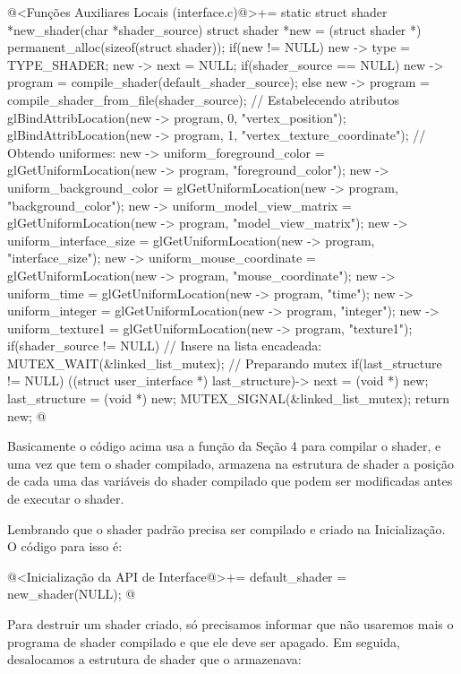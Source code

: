 \iniciocodigo
@<Funções Auxiliares Locais (interface.c)@>+=
static struct shader *new_shader(char *shader_source){
  struct shader *new = (struct shader *) permanent_alloc(sizeof(struct shader));
  if(new != NULL){
    new -> type = TYPE_SHADER;
    new -> next = NULL;
    if(shader_source == NULL)
      new -> program = compile_shader(default_shader_source);
    else
      new -> program = compile_shader_from_file(shader_source);
    // Estabelecendo atributos
    glBindAttribLocation(new -> program, 0, "vertex_position");
    glBindAttribLocation(new -> program, 1, "vertex_texture_coordinate");
    // Obtendo uniformes:
    new -> uniform_foreground_color =  glGetUniformLocation(new -> program,
                                                            "foreground_color");
    new -> uniform_background_color =  glGetUniformLocation(new -> program,
                                                            "background_color");
    new -> uniform_model_view_matrix = glGetUniformLocation(new -> program,
                                                            "model_view_matrix");
    new -> uniform_interface_size = glGetUniformLocation(new -> program,
                                                         "interface_size");
    new -> uniform_mouse_coordinate = glGetUniformLocation(new -> program,
                                                         "mouse_coordinate");
    new -> uniform_time = glGetUniformLocation(new -> program, "time");
    new -> uniform_integer = glGetUniformLocation(new -> program, "integer");
    new -> uniform_texture1 = glGetUniformLocation(new -> program, "texture1");
    if(shader_source != NULL){ // Insere na lista encadeada:
      MUTEX_WAIT(&linked_list_mutex); // Preparando mutex
      if(last_structure != NULL)
        ((struct user_interface *) last_structure)-> next = (void *) new;
      last_structure = (void *) new;
      MUTEX_SIGNAL(&linked_list_mutex);
    }
  }
  return new;
}
@
\fimcodigo

Basicamente o código acima usa a função da Seção 4 para compilar o
shader, e uma vez que tem o shader compilado, armazena na estrutura de
shader a posição de cada uma das variáveis do shader compilado que
podem ser modificadas antes de executar o shader.

Lembrando que o shader padrão precisa ser compilado e criado na
Inicialização. O código para isso é:

\iniciocodigo
@<Inicialização da API de Interface@>+=
default_shader = new_shader(NULL);
@
\fimcodigo

Para destruir um shader criado, só precisamos informar que não
usaremos mais o programa de shader compilado e que ele deve ser
apagado. Em seguida, desalocamos a estrutura de shader que o
armazenava:

